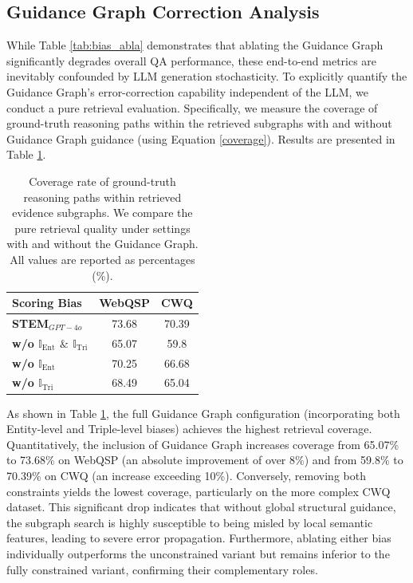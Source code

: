\documentclass[11pt]{article}
\begin{document}
\subsection{Guidance Graph Correction Analysis}
\label{sec:ggca}

While Table \ref{tab:bias_abla} demonstrates that ablating the Guidance Graph significantly degrades overall QA performance, these end-to-end metrics are inevitably confounded by LLM generation stochasticity. To explicitly quantify the Guidance Graph's error-correction capability independent of the LLM, we conduct a pure retrieval evaluation. Specifically, we measure the coverage of ground-truth reasoning paths within the retrieved subgraphs with and without Guidance Graph guidance (using Equation \ref{coverage}). Results are presented in Table \ref{tab:gg_cov}.

\begin{table}[t]
\footnotesize
\centering
\renewcommand{\arraystretch}{1.15}
\setlength{\tabcolsep}{2.5pt} 

\begin{tabular}{l|c|c}
\toprule
\hline
{\textbf{Scoring Bias}} & {\textbf{WebQSP}} & {\textbf{CWQ}} \\

\hline
\textbf{STEM$_{GPT-4o}$}  & 73.68 & 70.39 \\
\textbf{\;\;\;\; w/o $\mathbb{I}_\text{Ent}$ $\&$ $\mathbb{I}_\text{Tri}$}  & 65.07 & 59.8 \\
\textbf{\;\;\;\; w/o $\mathbb{I}_\text{Ent}$}    & 70.25 & 66.68  \\
\textbf{\;\;\;\; w/o $\mathbb{I}_\text{Tri}$} & 68.49 & 65.04  \\ 
\hline
\bottomrule
\end{tabular}
\caption{Coverage rate of ground-truth reasoning paths within retrieved evidence subgraphs. We compare the pure retrieval quality under settings with and without the Guidance Graph. All values are reported as percentages (\%).}
\label{tab:gg_cov}
\end{table}

As shown in Table \ref{tab:gg_cov}, the full Guidance Graph configuration (incorporating both Entity-level and Triple-level biases) achieves the highest retrieval coverage. Quantitatively, the inclusion of Guidance Graph increases coverage from 65.07\% to 73.68\% on WebQSP (an absolute improvement of over 8\%) and from 59.8\% to 70.39\% on CWQ (an increase exceeding 10\%). Conversely, removing both constraints yields the lowest coverage, particularly on the more complex CWQ dataset. This significant drop indicates that without global structural guidance, the subgraph search is highly susceptible to being misled by local semantic features, leading to severe error propagation. Furthermore, ablating either bias individually outperforms the unconstrained variant but remains inferior to the fully constrained variant, confirming their complementary roles. 
\end{document}
